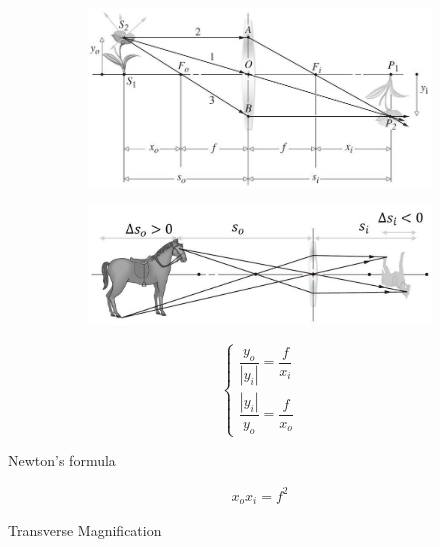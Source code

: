 \begin{figure}[H]
  \centering
  \begin{subfigure}{.5\textwidth}
    \centering
      \includegraphics[width=\linewidth]{figures/Magnification transverse.jpg}
    \label{fig:}
  \end{subfigure}%
  \begin{subfigure}{.5\textwidth}
    \centering
      \includegraphics[width=\linewidth]{figures/Magnification longitudinal.jpg}
    \label{fig:}
  \end{subfigure}
  \label{fig:}
\end{figure}


\begin{equation*}
  \left\{
  \begin{aligned}
    \dfrac{y_o}{|y_i|} = \dfrac{f}{x_i} \\
    \dfrac{|y_i|}{y_o} = \dfrac{f}{x_o}  
  \end{aligned}
  \right.
\end{equation*}

Newton's formula

\begin{equation*}
  \begin{aligned}
    x_o x_i = f^2
  \end{aligned}
\end{equation*}


Transverse Magnification

